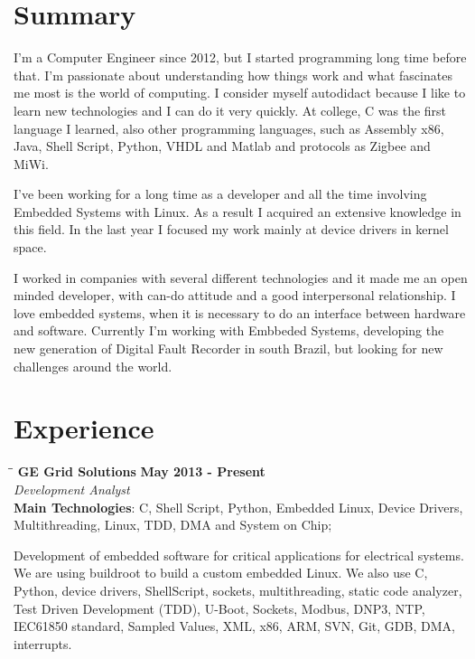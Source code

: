 \documentclass[margin]{res}
\begin{document}
\address{São José, BR \\ diogojusten@gmail.com \\ Phone: +55 (48) 9 9994-4758 }

\begin{resume}

\section{Summary}
I'm a Computer Engineer since 2012, but I started programming long time before that. I’m passionate about understanding how things work and what fascinates me most is the world of computing. I consider myself autodidact because I like to learn new technologies and I can do it very quickly. At college, C was the first language I learned, also other programming languages, such as Assembly x86, Java, Shell Script, Python, VHDL and Matlab and protocols as Zigbee and MiWi.

I've been working for a long time as a developer and all the time involving Embedded Systems with Linux. As a result I acquired an extensive knowledge in this field. In the last year I focused my work mainly at device drivers in kernel space. 

I worked in companies with several different technologies and it made me an open minded developer, with can-do attitude and a good interpersonal relationship. I love embedded systems, when it is necessary to do an interface between hardware and software. Currently I’m working with Embbeded Systems, developing the new generation of Digital Fault Recorder in south Brazil, but looking for new challenges around the world.

\section{Experience}
\vspace{-0.1in}
    \begin{tabbing}
    \hspace{2.3in}\= \hspace{1.7in}\= \kill %
    \textbf{GE Grid Solutions}    \>\>\textbf{May 2013 - Present}\\
    \textit{Development Analyst}\\
    \textbf{Main Technologies}: C, Shell Script, Python, Embedded Linux, Device Drivers,\\
                                Multithreading, Linux, TDD, DMA and System on Chip;
    \end{tabbing}\vspace{-20pt}      %
    \vspace{2mm}
Development of embedded software for critical applications for electrical systems. We are using buildroot to build a custom embedded Linux. We also use C, Python, device drivers, ShellScript, sockets, multithreading, static code analyzer, Test Driven Development (TDD), U-Boot, Sockets, Modbus, DNP3, NTP, IEC61850 standard, Sampled Values, XML, x86, ARM, SVN, Git, GDB, DMA, interrupts.


\end{resume}
\end{document}

